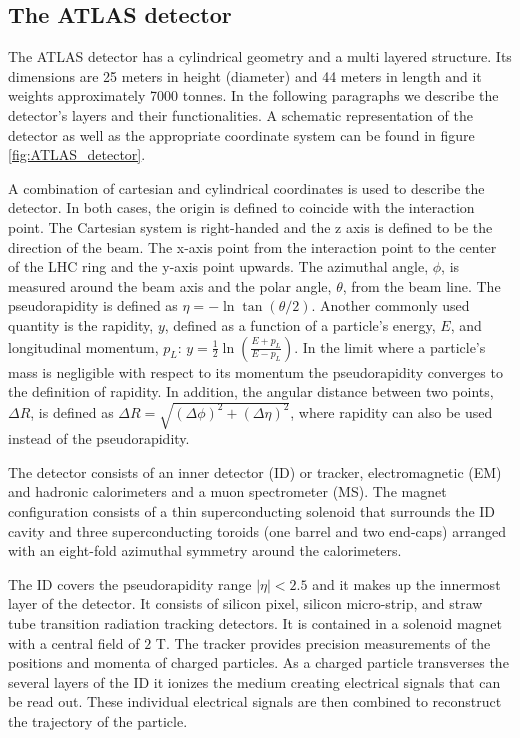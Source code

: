 \subsection{The ATLAS detector}
\label{section:ATLAS}

The ATLAS detector has a cylindrical geometry and a multi layered structure. Its dimensions are 25 meters in height (diameter) and 44 meters in length and it weights approximately 7000 tonnes. In the following paragraphs we describe the detector's layers and their functionalities. A schematic representation of the detector as well as the appropriate coordinate system can be found in figure \ref{fig:ATLAS_detector}.

A combination of cartesian and cylindrical coordinates is used to describe the detector. In both cases, the origin is defined to coincide with the interaction point. The Cartesian system is right-handed and the z axis is defined to be the direction of the beam. The x-axis point from the interaction point to the center of the LHC ring and the y-axis point upwards. The azimuthal angle, $\phi$, is measured around the beam axis and the polar angle, $\theta$, from the beam line. The pseudorapidity is defined as $\eta=-\ln \tan(\theta/2)$. Another commonly used quantity is the rapidity, $y$, defined as a function of a particle's energy, $E$, and longitudinal momentum, $p_L$: $y=\frac{1}{2}\ln \left(\frac{E+p_L}{E-p_L}\right)$. In the limit where a particle's mass is negligible with respect to its momentum the pseudorapidity converges to the definition of rapidity. In addition, the angular distance between two points, $\Delta R$, is defined as $\Delta R=\sqrt{(\Delta \phi)^2+(\Delta \eta)^2}$, where rapidity can also be used instead of the pseudorapidity. 

The detector consists of an inner detector (ID) or tracker, electromagnetic (EM) and hadronic calorimeters and a muon spectrometer (MS).
The magnet configuration consists of a thin superconducting solenoid that surrounds the ID cavity and three superconducting toroids (one barrel and two end-caps) arranged with an eight-fold azimuthal symmetry around the calorimeters.

The ID covers the pseudorapidity range $|\eta|<2.5$ and it makes up the innermost layer of the detector. It consists of silicon pixel, silicon micro-strip, and straw tube transition radiation tracking detectors. It is contained in a solenoid magnet with a central field of $2$ T. The tracker provides precision measurements of the positions and momenta of charged particles. As a charged particle transverses the several layers of the ID it ionizes the medium creating electrical signals that can be read out. These individual electrical signals are then combined to reconstruct the trajectory of the particle. 

